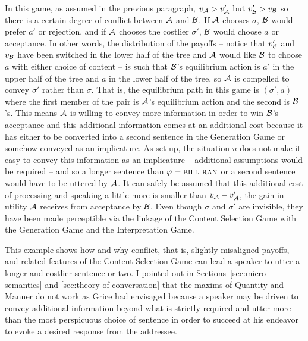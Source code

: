 In this game, as assumed in the previous paragraph, $v_{\cal A} > v'_{\cal A}$ but $v'_{\cal B} > v_{\cal B}$ so there is a certain degree of conflict between $\cal A$ and $\cal B$. If $\cal A$ chooses $\sigma$, $\cal B$ would prefer $a'$ or rejection, and if $\cal A$ chooses the costlier $\sigma'$, $\cal B$ would choose $a$ or acceptance. In other words, the distribution of the payoffs -- notice that $v'_{\cal B}$ and $v_{\cal B}$ have been switched in the lower half of the tree and $\cal A$ would like $\cal B$ to choose $a$ with either choice of content -- is such that $\cal B$'s equilibrium action is $a'$ in the upper half of the tree and $a$ in the lower half of the tree, so $\cal A$ is compelled to convey $\sigma'$ rather than $\sigma$. That is, the equilibrium path in this game is $(\sigma', a)$ where the first member of the pair is $\cal A$'s equilibrium action and the second is $\cal B$'s. This means $\cal A$ is willing to convey more information in order to win $\cal B$'s acceptance and this additional information comes at an additional cost because it has either to be converted into a second sentence in the Generation Game or somehow conveyed as an implicature. As set up, the situation $u$ does not make it easy to convey this information as an implicature -- additional assumptions would be required -- and so a longer sentence than $\varphi = \Expression{bill ran}$ or a second sentence would have to be uttered by $\cal A$. It can safely be assumed that this additional cost of processing and speaking a little more is smaller than $v_{\cal A} - v'_{\cal A}$, the gain in utility $\cal A$ receives from acceptance by $\cal B$. Even though $\sigma$ and $\sigma'$ are invisible, they have been made perceptible via the linkage of the Content Selection Game with the Generation Game and the Interpretation Game.

This example shows how and why conflict, that is, slightly misaligned payoffs, and related features of the Content Selection Game can lead a speaker to utter a longer and costlier sentence or two. I pointed out in Sections~\ref{sec:micro-semantics} and \ref{sec:theory of conversation} that the maxims of Quantity and Manner do not work as Grice had envisaged because a speaker may be driven to convey additional information beyond what is strictly required and utter more than the most perspicuous choice of sentence in order to succeed at his endeavor to evoke a desired response from the addressee.

